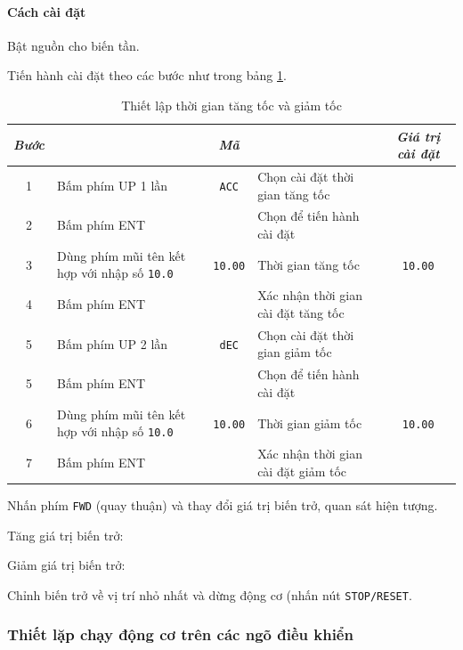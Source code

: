 \documentclass[13pt,a4paper]{extarticle}
\begin{document}
\paragraph{Cách cài đặt}
\begin{list}{--}{}
\item Bật nguồn cho biến tần.
\item Tiến hành cài đặt theo các bước như trong bảng \ref{Tab:acc}.
\begin{table}[!h]
\begin{center}
\begin{longtable}{|c|p{5cm}|c|p{5cm}|c|} \hline
\textit{Bước} & \centering{Lệnh} & \textit{Mã} & \centering{\textit{Mô tả}} & \textit{Giá trị cài đặt} \\ \hline
1 & Bấm phím UP 1 lần & \verb|ACC| & Chọn cài đặt thời gian tăng tốc & \\ \hline
2 & Bấm phím ENT &  & Chọn để tiến hành cài đặt &  \\ \hline
3 & Dùng phím mũi tên kết hợp với nhập số \verb|10.0| & \verb|10.00| & Thời gian tăng tốc & \verb|10.00| \\ \hline
4 & Bấm phím ENT &  & Xác nhận thời gian cài đặt tăng tốc &  \\ \hline
5 & Bấm phím UP 2 lần & \verb|dEC| & Chọn cài đặt thời gian giảm tốc & \\ \hline
5 & Bấm phím ENT &  & Chọn để tiến hành cài đặt &  \\ \hline
6 & Dùng phím mũi tên kết hợp với nhập số \verb|10.0| & \verb|10.00| & Thời gian giảm tốc & \verb|10.00| \\ \hline
7 & Bấm phím ENT &  & Xác nhận thời gian cài đặt giảm tốc &  \\ \hline
\end{longtable}
\end{center}
\caption{Thiết lập thời gian tăng tốc và giảm tốc}
\label{Tab:acc}
\end{table}
\item Nhấn phím \verb|FWD| (quay thuận) và thay đổi giá trị biến trở, quan sát hiện tượng.
\begin{list}{+}{}
\item Tăng giá trị biến trở:
\item Giảm giá trị biến trở:
\end{list}
\item Chỉnh biến trở về vị trí nhỏ nhất và dừng động cơ (nhấn nút \verb|STOP/RESET|.
\end{list}
\subsubsection{Thiết lặp chạy động cơ trên các ngõ điều khiển}
\end{document}
